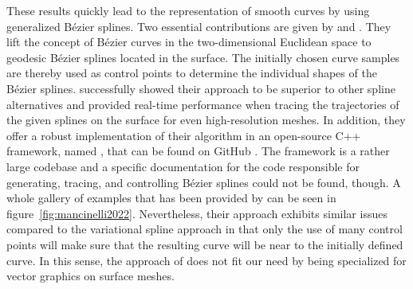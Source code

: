 \documentclass{stdlocal}
\begin{document}
These results quickly lead to the representation of smooth curves by using generalized Bézier splines.
Two essential contributions are given by \textcite{martinez2007} and \textcite{mancinelli2022}.
They lift the concept of Bézier curves in the two-dimensional Euclidean space to geodesic Bézier splines located in the surface.
The initially chosen curve samples are thereby used as control points to determine the individual shapes of the Bézier splines.
\textcite{mancinelli2022} successfully showed their approach to be superior to other spline alternatives and provided real-time performance when tracing the trajectories of the given splines on the surface for even high-resolution meshes.
In addition, they offer a robust implementation of their algorithm in an open-source C++ framework, named  \autocite{agus2019}, that can be found on GitHub .
The framework is a rather large codebase and a specific documentation for the code responsible for generating, tracing, and controlling Bézier splines could not be found, though.
A whole gallery of examples that has been provided by \textcite{mancinelli2022} can be seen in figure~\ref{fig:mancinelli2022}.
Nevertheless, their approach exhibits similar issues compared to the variational spline approach in that only the use of many control points will make sure that the resulting curve will be near to the initially defined curve.
In this sense, the approach of \textcite{mancinelli2022} does not fit our need by being specialized for vector graphics on surface meshes.
\end{document}
